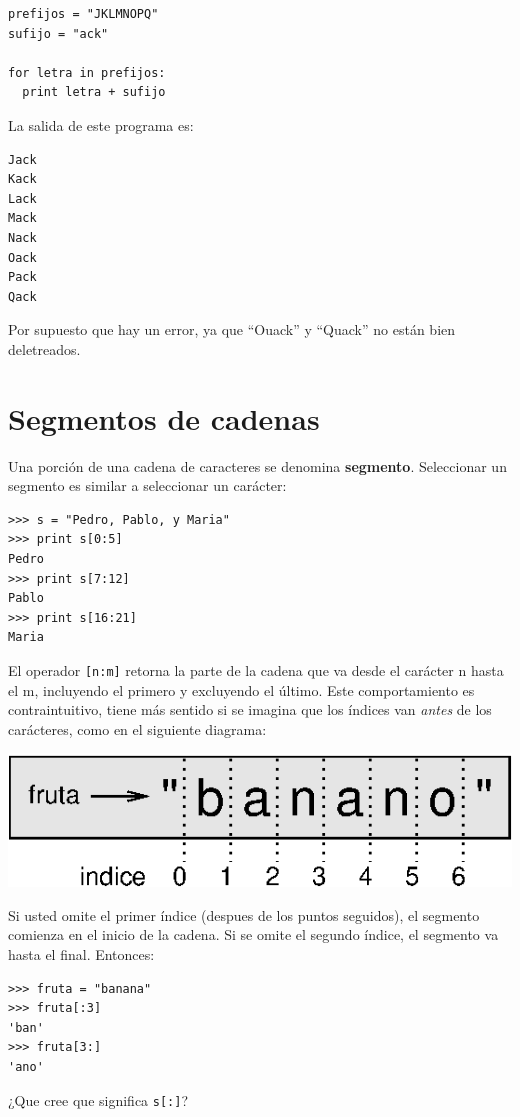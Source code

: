 \beforeverb
\begin{verbatim}
prefijos = "JKLMNOPQ"
sufijo = "ack"

for letra in prefijos:
  print letra + sufijo
\end{verbatim}
\afterverb
%
La salida de este programa es:

\beforeverb
\begin{verbatim}
Jack
Kack
Lack
Mack
Nack
Oack
Pack
Qack
\end{verbatim}
\afterverb
%
Por supuesto que hay un error, ya que ``Ouack'' y
``Quack'' no están bien deletreados.


\section{Segmentos de cadenas }
\label{slice}

Una porción de una cadena de caracteres se denomina {\bf segmento}.  
Seleccionar un segmento es similar a seleccionar un carácter:

\beforeverb
\begin{verbatim}
>>> s = "Pedro, Pablo, y Maria"
>>> print s[0:5]
Pedro
>>> print s[7:12]
Pablo
>>> print s[16:21]
Maria
\end{verbatim}
\afterverb
%
El operador \texttt{[n:m]} retorna la parte de la cadena
que va desde el carácter n hasta el m, incluyendo el 
primero y excluyendo el último. Este comportamiento
es contraintuitivo, tiene más sentido si se imagina
que los índices van {\em antes} de los
carácteres, como en el siguiente diagrama:

\beforefig
\centerline{\includegraphics{illustrations/banana.eps}}
\afterfig

Si usted omite el primer índice (despues de los puntos seguidos), el
segmento comienza en el inicio de la cadena. Si se omite el segundo
índice, el segmento va hasta el final. Entonces:

\beforeverb
\begin{verbatim}
>>> fruta = "banana"
>>> fruta[:3]
'ban'
>>> fruta[3:]
'ano'
\end{verbatim}
\afterverb
%
¿Que cree que significa \texttt{s[:]}?



